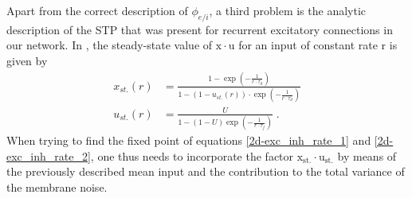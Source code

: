 \documentclass[10pt,a4paper]{article}
\begin{document}
Apart from the correct description of $\phi_{e/i}$, a third problem is the analytic description of the STP that was present for recurrent excitatory connections in our network. In \cite{Markram_STP}, the steady-state value of $\mathrm{x\cdot u}$ for an input of constant rate $\mathrm{r}$ is given by
\begin{align}
x_{st.}(r) &= \frac{1-\exp \left(-\frac{1}{r\cdot \tau _d}\right)}{1-\left(1-u_{st.}\left(r\right)\right)\cdot \exp \left(-\frac{1}{r\cdot \tau _d}\right)} \label{STP_steady1} \\
u_{st.}(r) &= \frac{U}{1-\left(1-U\right)\exp \left(-\frac{1}{r\cdot \tau _f}\right)} \; .\label{STP_steady2}
\end{align}
When trying to find the fixed point of equations \ref{2d-exc_inh_rate_1} and \ref{2d-exc_inh_rate_2}, one thus needs to incorporate the factor $\mathrm{x_{st.}\cdot u_{st.}}$ by means of the previously described mean input and the contribution to the total variance of the membrane noise.
 
\end{document}
